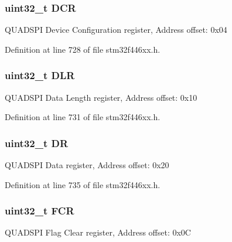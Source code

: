 \subsubsection[{\texorpdfstring{D\+CR}{DCR}}]{ uint32\+\_\+t D\+CR}\hypertarget{struct_q_u_a_d_s_p_i___type_def_af6225cb8f4938f98204d11afaffd41c9}{}\label{struct_q_u_a_d_s_p_i___type_def_af6225cb8f4938f98204d11afaffd41c9}
Q\+U\+A\+D\+S\+PI Device Configuration register, Address offset\+: 0x04 

Definition at line 728 of file stm32f446xx.\+h.

\subsubsection[{\texorpdfstring{D\+LR}{DLR}}]{ uint32\+\_\+t D\+LR}\hypertarget{struct_q_u_a_d_s_p_i___type_def_a651b3980342dcf21d301d29621dcf4f6}{}\label{struct_q_u_a_d_s_p_i___type_def_a651b3980342dcf21d301d29621dcf4f6}
Q\+U\+A\+D\+S\+PI Data Length register, Address offset\+: 0x10 

Definition at line 731 of file stm32f446xx.\+h.

\subsubsection[{\texorpdfstring{DR}{DR}}]{ uint32\+\_\+t DR}\hypertarget{struct_q_u_a_d_s_p_i___type_def_a3df0d8dfcd1ec958659ffe21eb64fa94}{}\label{struct_q_u_a_d_s_p_i___type_def_a3df0d8dfcd1ec958659ffe21eb64fa94}
Q\+U\+A\+D\+S\+PI Data register, Address offset\+: 0x20 

Definition at line 735 of file stm32f446xx.\+h.

\subsubsection[{\texorpdfstring{F\+CR}{FCR}}]{ uint32\+\_\+t F\+CR}\hypertarget{struct_q_u_a_d_s_p_i___type_def_a5d5cc7f32884945503dd29f8f6cbb415}{}\label{struct_q_u_a_d_s_p_i___type_def_a5d5cc7f32884945503dd29f8f6cbb415}
Q\+U\+A\+D\+S\+PI Flag Clear register, Address offset\+: 0x0C 

